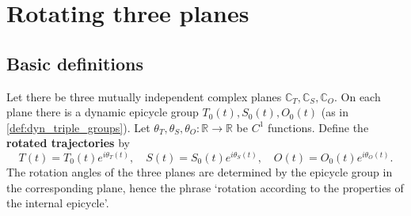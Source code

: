 \section{Rotating three planes}
\label{sec:dyn_rotating_planes}

\subsection{Basic definitions}

\begin{definition}\label{def:dyn_rotating_planes}
Let there be three mutually independent complex planes $\mathbb C_T,\mathbb C_S,\mathbb C_O$. On each plane there is a dynamic epicycle group $T_0(t),S_0(t),O_0(t)$ (as in \cref{def:dyn_triple_groups}). Let $\theta_T,\theta_S,\theta_O:\mathbb R\to\mathbb R$ be $C^1$ functions. Define the \textbf{rotated trajectories} by
\[
T(t)=T_0(t)e^{i\theta_T(t)},\quad
S(t)=S_0(t)e^{i\theta_S(t)},\quad
O(t)=O_0(t)e^{i\theta_O(t)}.
\]
The rotation angles of the three planes are determined by the epicycle group in the corresponding plane, hence the phrase `rotation according to the properties of the internal epicycle'.
\end{definition}

